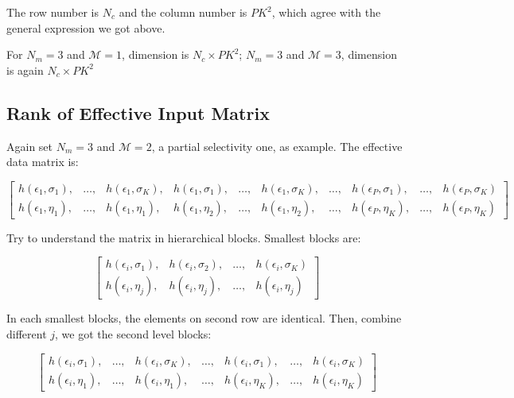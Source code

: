 \documentclass[conference]{acmsiggraph}
\begin{document}
The row number is $N_c$ and the column number is $PK^2$, which agree with the general expression we got above.

For $N_m = 3$ and $\mathcal{M} = 1$, dimension is $N_c \times PK^2$; $N_m = 3$ and $\mathcal{M} = 3$, dimension is again $N_c \times PK^2$


\subsection{Rank of Effective Input Matrix}

Again set $N_m = 3$ and $\mathcal{M} = 2$, a partial selectivity one, as example. The effective data matrix is: 

\begin{equation}
\begin{bmatrix}
h(\epsilon_1,\sigma_1), & \dots, & h(\epsilon_1,\sigma_K), & h(\epsilon_1,\sigma_1), & \dots, & h(\epsilon_1,\sigma_K), & \dots, & h(\epsilon_P,\sigma_1), & \dots, & h(\epsilon_P,\sigma_K) \\
h(\epsilon_1,\eta_1), & \dots, & h(\epsilon_1,\eta_1), & h(\epsilon_1,\eta_2), & \dots, & h(\epsilon_1,\eta_2), & \dots, & h(\epsilon_P,\eta_K), & \dots, & h(\epsilon_P,\eta_K)
\end{bmatrix}
\end{equation}

Try to understand the matrix in hierarchical blocks. Smallest blocks are:

\begin{equation}
\begin{bmatrix}
h(\epsilon_i,\sigma_1), & h(\epsilon_i,\sigma_2),& \dots, & h(\epsilon_i,\sigma_K)  \\
h(\epsilon_i,\eta_j),&h(\epsilon_i,\eta_j),& \dots, & h(\epsilon_i,\eta_j)
\end{bmatrix}
\end{equation}

In each smallest blocks, the elements on second row are identical. Then, combine different $j$, we got the second level blocks:

\begin{equation}
\begin{bmatrix}
h(\epsilon_i,\sigma_1), & \dots, & h(\epsilon_i,\sigma_K), & \dots, &h(\epsilon_i,\sigma_1), & \dots, & h(\epsilon_i,\sigma_K)\\
h(\epsilon_i,\eta_1), & \dots, & h(\epsilon_i,\eta_1),& \dots, &h(\epsilon_i,\eta_K), & \dots, & h(\epsilon_i,\eta_K)
\end{bmatrix}
\end{equation}
\end{document}
